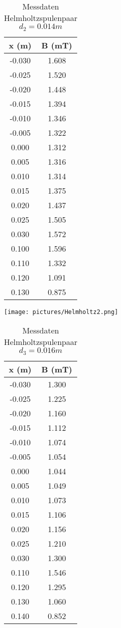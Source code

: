 \begin{table}
\centering
\caption{Messdaten Helmholtzspulenpaar $d_{2} = 0.014m$}
\begin{tabular}{c c}
  \toprule
   x (m) &  B (mT) \\
  \midrule
  -0.030 &        1.608 \\
  -0.025 &        1.520 \\
  -0.020 &        1.448 \\
  -0.015 &        1.394 \\
  -0.010 &        1.346 \\
  -0.005 &        1.322 \\
   0.000 &        1.312 \\
   0.005 &        1.316 \\
   0.010 &        1.314 \\
   0.015 &        1.375 \\
   0.020 &        1.437 \\
   0.025 &        1.505 \\
   0.030 &        1.572 \\
   0.100 &        1.596 \\
   0.110 &        1.332 \\
   0.120 &        1.091 \\
   0.130 &        0.875 \\
  \bottomrule
  \end{tabular}
\end{table}

\texttt{[image: pictures/Helmholtz2.png]}    %


\begin{table}
  \centering
  \caption{Messdaten Helmholtzspulenpaar $d_{3} = 0.016m$}
  \begin{tabular}{c c}
    \toprule
     x (m) &  B (mT) \\
    \midrule
    -0.030 &        1.300 \\
    -0.025 &        1.225 \\
    -0.020 &        1.160 \\
    -0.015 &        1.112 \\
    -0.010 &        1.074 \\
    -0.005 &        1.054 \\
     0.000 &        1.044 \\
     0.005 &        1.049 \\
     0.010 &        1.073 \\
     0.015 &        1.106 \\
     0.020 &        1.156 \\
     0.025 &        1.210 \\
     0.030 &        1.300 \\
     0.110 &        1.546 \\
     0.120 &        1.295 \\
     0.130 &        1.060 \\
     0.140 &        0.852 \\
    \bottomrule
  \end{tabular}
\end{table}

